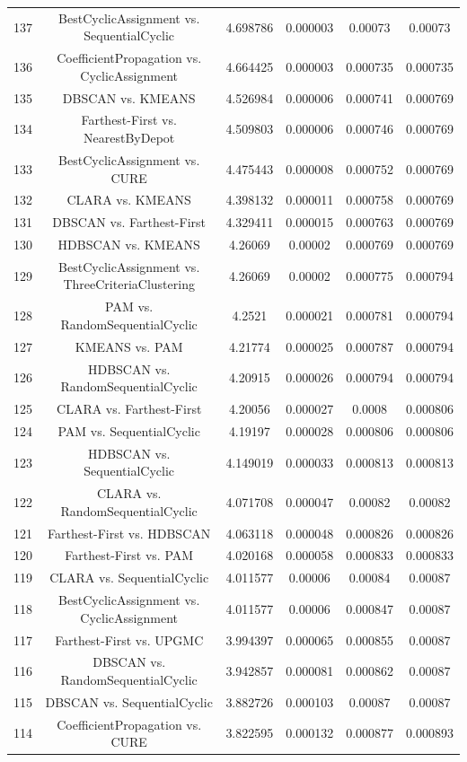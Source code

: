 \documentclass[a4paper,10pt]{article}
\begin{document}
\begin{landscape}
\begin{table}[!htp]
\begin{tabular}{cccccc}
137&BestCyclicAssignment vs. SequentialCyclic&4.698786&0.000003&0.00073&0.00073\\
136&CoefficientPropagation vs. CyclicAssignment&4.664425&0.000003&0.000735&0.000735\\
135&DBSCAN vs. KMEANS&4.526984&0.000006&0.000741&0.000769\\
134&Farthest-First vs. NearestByDepot&4.509803&0.000006&0.000746&0.000769\\
133&BestCyclicAssignment vs. CURE&4.475443&0.000008&0.000752&0.000769\\
132&CLARA vs. KMEANS&4.398132&0.000011&0.000758&0.000769\\
131&DBSCAN vs. Farthest-First&4.329411&0.000015&0.000763&0.000769\\
130&HDBSCAN vs. KMEANS&4.26069&0.00002&0.000769&0.000769\\
129&BestCyclicAssignment vs. ThreeCriteriaClustering&4.26069&0.00002&0.000775&0.000794\\
128&PAM vs. RandomSequentialCyclic&4.2521&0.000021&0.000781&0.000794\\
127&KMEANS vs. PAM&4.21774&0.000025&0.000787&0.000794\\
126&HDBSCAN vs. RandomSequentialCyclic&4.20915&0.000026&0.000794&0.000794\\
125&CLARA vs. Farthest-First&4.20056&0.000027&0.0008&0.000806\\
124&PAM vs. SequentialCyclic&4.19197&0.000028&0.000806&0.000806\\
123&HDBSCAN vs. SequentialCyclic&4.149019&0.000033&0.000813&0.000813\\
122&CLARA vs. RandomSequentialCyclic&4.071708&0.000047&0.00082&0.00082\\
121&Farthest-First vs. HDBSCAN&4.063118&0.000048&0.000826&0.000826\\
120&Farthest-First vs. PAM&4.020168&0.000058&0.000833&0.000833\\
119&CLARA vs. SequentialCyclic&4.011577&0.00006&0.00084&0.00087\\
118&BestCyclicAssignment vs. CyclicAssignment&4.011577&0.00006&0.000847&0.00087\\
117&Farthest-First vs. UPGMC&3.994397&0.000065&0.000855&0.00087\\
116&DBSCAN vs. RandomSequentialCyclic&3.942857&0.000081&0.000862&0.00087\\
115&DBSCAN vs. SequentialCyclic&3.882726&0.000103&0.00087&0.00087\\
114&CoefficientPropagation vs. CURE&3.822595&0.000132&0.000877&0.000893\\

\end{tabular}
\end{table}
\end{landscape}
\end{document}
